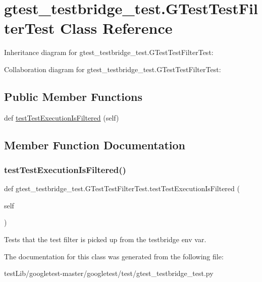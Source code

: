 \hypertarget{classgtest__testbridge__test_1_1GTestTestFilterTest}{}\section{gtest\+\_\+testbridge\+\_\+test.\+G\+Test\+Test\+Filter\+Test Class Reference}
\label{classgtest__testbridge__test_1_1GTestTestFilterTest}


Inheritance diagram for gtest\+\_\+testbridge\+\_\+test.\+G\+Test\+Test\+Filter\+Test\+:


Collaboration diagram for gtest\+\_\+testbridge\+\_\+test.\+G\+Test\+Test\+Filter\+Test\+:
\subsection*{Public Member Functions}
\begin{DoxyCompactItemize}
\item 
def \hyperlink{classgtest__testbridge__test_1_1GTestTestFilterTest_af41ae1fea4ec08f5594ad1ae78663d3c}{test\+Test\+Execution\+Is\+Filtered} (self)
\end{DoxyCompactItemize}


\subsection{Member Function Documentation}
\mbox{\label{classgtest__testbridge__test_1_1GTestTestFilterTest_af41ae1fea4ec08f5594ad1ae78663d3c}} 
\subsubsection{\texorpdfstring{test\+Test\+Execution\+Is\+Filtered()}{testTestExecutionIsFiltered()}}
{\footnotesize\ttfamily def gtest\+\_\+testbridge\+\_\+test.\+G\+Test\+Test\+Filter\+Test.\+test\+Test\+Execution\+Is\+Filtered (\begin{DoxyParamCaption}\item[{}]{self }\end{DoxyParamCaption})}

\begin{DoxyVerb}Tests that the test filter is picked up from the testbridge env var.\end{DoxyVerb}
 

The documentation for this class was generated from the following file\+:\begin{DoxyCompactItemize}
\item 
test\+Lib/googletest-\/master/googletest/test/gtest\+\_\+testbridge\+\_\+test.\+py\end{DoxyCompactItemize}
